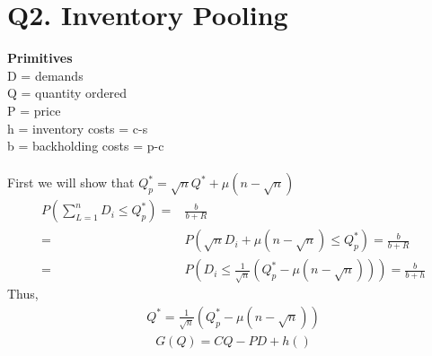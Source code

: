 \documentclass[10pt,a4paper]{article}
\begin{document}
\section{Q2. Inventory Pooling}
\textbf{Primitives}\\
D = demands \\
Q = quantity ordered \\
P = price \\
h = inventory costs =  c-s \\
b = backholding costs = p-c \\
\\
First we will show that $Q_p^* = \sqrt{n}Q^* + \mu(n- \sqrt{n})$%
\begin{align*}
	P (\sum_{L= 1}^n D_i \leq Q_p^*) = &  \frac{b}{b+R} \\
	= & P(\sqrt{n}D_i + \mu(n - \sqrt{n})\leq Q_p^*) = \frac{b}{b+R} \\
	= & P(D_i \leq \frac{1}{\sqrt{n}}(Q_p^*- \mu(n-\sqrt{n})))= \frac{b}{b + h}
\end{align*}
Thus, 
\begin{align*}
Q^* = \frac{1}{\sqrt{n}}(Q_p^*- \mu(n-\sqrt{n}))
\end{align*}
\begin{align*}
G(Q) = CQ - PD + h ()
\end{align*}
	
\end{document}
